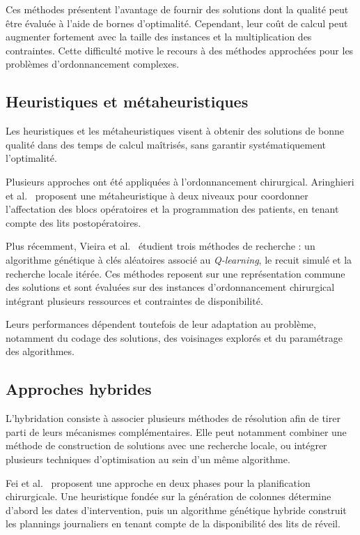 \documentclass[11pt,a4paper]{article}
\begin{document}
Ces méthodes présentent l'avantage de fournir des solutions dont la qualité peut être évaluée à l'aide de bornes d'optimalité. Cependant, leur coût de calcul peut augmenter fortement avec la taille des instances et la multiplication des contraintes. Cette difficulté motive le recours à des méthodes approchées pour les problèmes d'ordonnancement complexes.

\subsection{Heuristiques et métaheuristiques}

Les heuristiques et les métaheuristiques visent à obtenir des solutions de bonne qualité dans des temps de calcul maîtrisés, sans garantir systématiquement l'optimalité.

Plusieurs approches ont été appliquées à l'ordonnancement chirurgical. Aringhieri et al.~\cite{aringhieri2015} proposent une métaheuristique à deux niveaux pour coordonner l'affectation des blocs opératoires et la programmation des patients, en tenant compte des lits postopératoires.

Plus récemment, Vieira et al.~\cite{vieira2025} étudient trois méthodes de recherche : un algorithme génétique à clés aléatoires associé au \textit{Q-learning}, le recuit simulé et la recherche locale itérée. Ces méthodes reposent sur une représentation commune des solutions et sont évaluées sur des instances d'ordonnancement chirurgical intégrant plusieurs ressources et contraintes de disponibilité.

Leurs performances dépendent toutefois de leur adaptation au problème, notamment du codage des solutions, des voisinages explorés et du paramétrage des algorithmes.

\subsection{Approches hybrides}

L'hybridation consiste à associer plusieurs méthodes de résolution afin de tirer parti de leurs mécanismes complémentaires. Elle peut notamment combiner une méthode de construction de solutions avec une recherche locale, ou intégrer plusieurs techniques d'optimisation au sein d'un même algorithme.

Fei et al.~\cite{fei2010} proposent une approche en deux phases pour la planification chirurgicale. Une heuristique fondée sur la génération de colonnes détermine d'abord les dates d'intervention, puis un algorithme génétique hybride construit les plannings journaliers en tenant compte de la disponibilité des lits de réveil.
\end{document}
